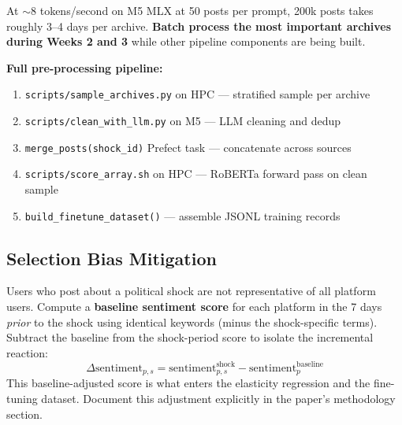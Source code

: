\documentclass[11pt]{article}
\begin{document}
At $\sim$8 tokens/second on M5 MLX at 50 posts per prompt, 200k posts takes
roughly 3--4 days per archive. \textbf{Batch process the most important archives
during Weeks 2 and 3} while other pipeline components are being built.

\medskip
\noindent\textbf{Full pre-processing pipeline:}
\begin{enumerate}[leftmargin=2em, itemsep=1pt]
  \item \texttt{scripts/sample\_archives.py} on HPC --- stratified sample per archive
  \item \texttt{scripts/clean\_with\_llm.py} on M5 --- LLM cleaning and dedup
  \item \texttt{merge\_posts(shock\_id)} Prefect task --- concatenate across sources
  \item \texttt{scripts/score\_array.sh} on HPC --- RoBERTa forward pass on clean sample
  \item \texttt{build\_finetune\_dataset()} --- assemble JSONL training records
\end{enumerate}

\subsection*{Selection Bias Mitigation}

Users who post about a political shock are not representative of all platform users.
Compute a \textbf{baseline sentiment score} for each platform in the 7 days \emph{prior}
to the shock using identical keywords (minus the shock-specific terms). Subtract the
baseline from the shock-period score to isolate the incremental reaction:
\[
  \Delta\mathrm{sentiment}_{p,s} =
  \mathrm{sentiment}_{p,s}^{\mathrm{shock}} -
  \mathrm{sentiment}_{p}^{\mathrm{baseline}}
\]
This baseline-adjusted score is what enters the elasticity regression and the
fine-tuning dataset. Document this adjustment explicitly in the paper's methodology
section.
\end{document}
